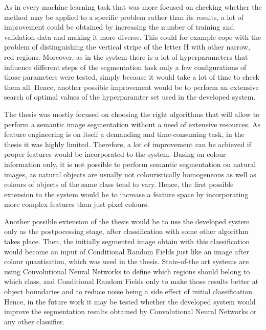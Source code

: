 As in every machine learning task that was more focused on checking whether the method may be applied to a specific problem rather than its results, a lot of improvement could be obtained by increasing the number of training and validation data and making it more diverse. This could for example cope with the problem of distinguishing the vertical stripe of the letter H with other narrow, red regions. Moreover, as in the system there is a lot of hyperparameters that influence different steps of the segmentation task only a few configurations of those parameters were tested, simply because it would take a lot of time to check them all. Hence, another possible improvement would be to perform an extensive search of optimal values of the hyperparamter set used in the developed system. 

The thesis was mostly focused on choosing the right algorithms that will allow to perform a semantic image segmentation without a need of extensive resources. As feature engineering is on itself a demanding and time-consuming task, in the thesis it was highly limited. Therefore, a lot of improvement can be achieved if proper features would be incorporated to the system. Basing on colour information only, it is not possible to perform semantic segmentation on natural images, as natural objects are usually not colouristically homogeneous as well as colours of objects of the same class tend to vary. Hence, the first possible extension to the system would be to increase a feature space by incorporating more complex features than just pixel colours.

Another possible extension of the thesis would be to use the developed system only as the postpocessing stage, after classification with some other algorithm takes place. Then, the initially segmented image obtain with this classification would become an input of Conditional Random Fields just like an image after colour quantisation, which was used in the thesis. State-of-the art systems are using Convolutional Neural Networks to define which regions should belong to which class, and Conditional Random Fields only to make those results better at object boundaries and to reduce noise being a side effect of initial classification. Hence, in the future work it may be tested whether the developed system would improve the segmentation results obtained by Convolutional Neural Networks or any other classifier. 